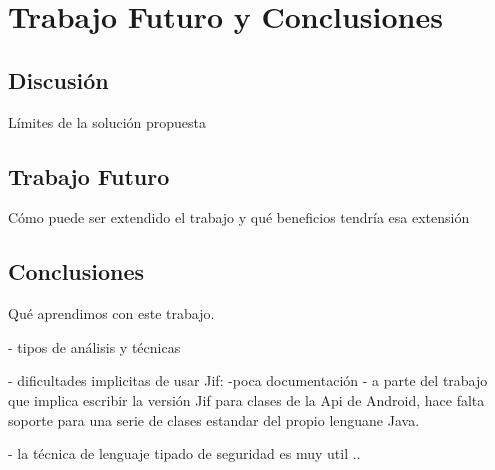 \label{ch:trabajoFuturo}
\chapter{Trabajo Futuro y Conclusiones}
\section{Discusión}
Límites de la solución propuesta 

\section{Trabajo Futuro}
Cómo puede ser extendido el trabajo y qué beneficios tendría esa extensión 

\section{Conclusiones}
Qué aprendimos con este trabajo.\newline

- tipos de análisis y técnicas

- dificultades implicitas de usar Jif:\newline
-poca documentación
- a parte del trabajo que implica escribir la versión Jif para clases de la Api
de Android, hace falta soporte para una serie de clases estandar del propio
lenguane Java. \newline

- la técnica de lenguaje tipado de seguridad es muy util ..


